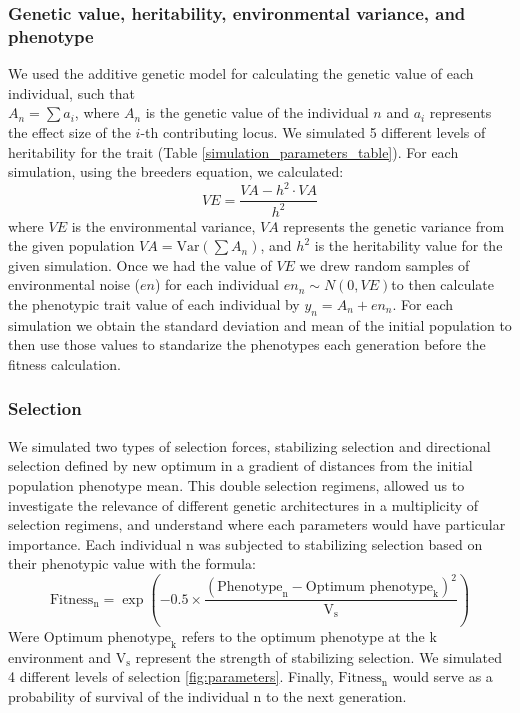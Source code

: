 \documentclass{article}
\begin{document}
\subsubsection{Genetic value, heritability, environmental variance, and phenotype}

We used the additive genetic model for calculating the genetic value of each individual, such that \\ $A_n=\sum a_i$, where $A_n$ is the genetic value of the individual $n$ and \( a_i \) represents the effect size of the \( i \)-th contributing locus. We simulated 5 different levels of heritability for the trait (Table \ref{simulation_parameters_table}). For each simulation, using the breeders equation, we calculated:
\[
VE = \frac{VA - h^2 \cdot VA}{h^2}
\]
where \( VE \) is the environmental variance, \( VA \) represents the genetic variance from the given population \( VA = \text{Var}\left(\sum A_n\right) \), and \( h^2 \) is the heritability value for the given simulation. Once we had the value of \( VE \) we drew random samples of environmental noise (\( en \)) for each individual \( en_n \sim N(0, VE) \)to then calculate the phenotypic trait value of each individual by \( y_n = A_n+ en_n \). For each simulation we obtain the standard deviation and mean of the initial population to then use those values to standarize the phenotypes each generation before the fitness calculation.


\subsubsection{Selection}
We simulated two types of selection forces, stabilizing selection and directional selection defined by new optimum in a gradient of distances from the initial population phenotype mean. This double selection regimens, allowed us to investigate the relevance of different genetic architectures in a multiplicity of selection regimens, and understand where each parameters would have particular importance. 
Each individual n was subjected to stabilizing selection based on their phenotypic value with the formula:
\[
\text{Fitness}_\text{n} = \exp\left(-0.5 \times \frac{(\text{Phenotype}_\text{n} - {\text{Optimum phenotype}_\text{k}})^2}{\text{V}_\text{s}}\right)
\]
Were $\text{Optimum phenotype}_\text{k}$ refers to the optimum phenotype at the k environment and $\text{V}_\text{s}$ represent the strength of stabilizing selection. We simulated 4 different levels of selection \ref{fig:parameters}. Finally,  $\text{Fitness}_\text{n}$ would serve as a probability of survival of the individual n to the next generation.
\end{document}
